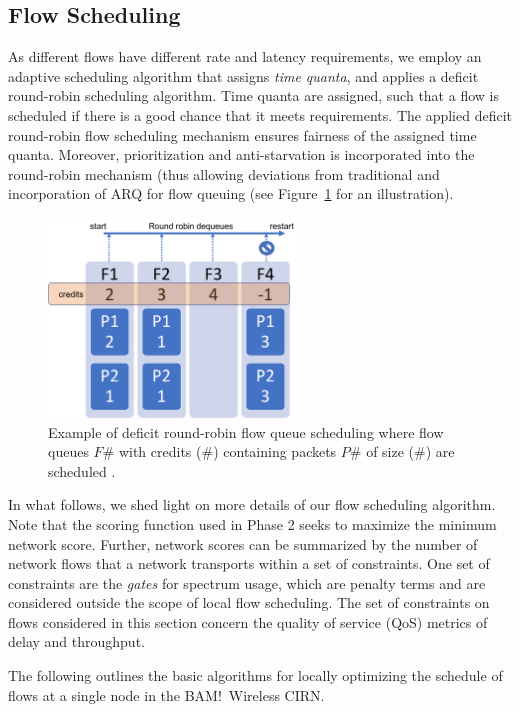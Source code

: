 \documentclass[11pt]{article}
\begin{document}
\subsection{Flow Scheduling}
As different flows have different rate and latency requirements, we employ an adaptive scheduling algorithm that assigns \emph{time quanta}, and applies a deficit round-robin scheduling algorithm. Time quanta are assigned, such that a flow is scheduled if there is a good chance that it meets requirements. The applied deficit round-robin flow scheduling mechanism ensures fairness of the assigned time quanta.  Moreover, prioritization and anti-starvation is incorporated into the round-robin mechanism (thus allowing deviations from traditional and incorporation of ARQ for flow queuing (see Figure~\ref{fig:schedule} for an illustration).
\begin{figure} [htb]
     \centerline{
     \includegraphics[width = 0.6\textwidth]{Figures/DeficitRR.png}}
     \caption{Example of deficit round-robin flow queue scheduling where flow queues $F\#$ with credits ($\#$) containing packets $P\#$ of size ($\#$) are scheduled \cite[Figure $3$]{func-report}.}
     \label{fig:schedule}
     \end{figure}

In what follows, we shed light on more details of our flow scheduling algorithm. Note that the scoring function used in Phase 2 seeks to maximize the minimum network score. Further, network scores can be summarized by the number of network flows that a network transports within a set of constraints.  One set of constraints are the \emph{gates} for spectrum usage, which are penalty terms and are considered outside the scope of local flow scheduling. The set of constraints on flows considered in this section concern the quality of service (QoS) metrics of delay and throughput.

The following outlines the basic algorithms for locally optimizing the schedule of flows at a single node in the BAM!\ Wireless CIRN.
\end{document}
